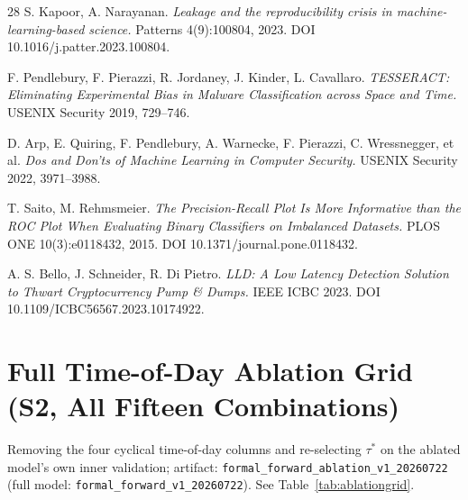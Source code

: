 \documentclass[runningheads]{llncs}
\begin{document}
\begin{thebibliography}{28}
S. Kapoor, A. Narayanan. \emph{Leakage and the reproducibility crisis
in machine-learning-based science.} Patterns 4(9):100804, 2023. DOI
10.1016/j.patter.2023.100804.

F. Pendlebury, F. Pierazzi, R. Jordaney, J. Kinder, L. Cavallaro.
\emph{TESSERACT: Eliminating Experimental Bias in Malware
Classification across Space and Time.} USENIX Security 2019, 729--746.

D. Arp, E. Quiring, F. Pendlebury, A. Warnecke, F. Pierazzi, C.
Wressnegger, et al. \emph{Dos and Don'ts of Machine Learning in
Computer Security.} USENIX Security 2022, 3971--3988.

T. Saito, M. Rehmsmeier. \emph{The Precision-Recall Plot Is More
Informative than the ROC Plot When Evaluating Binary Classifiers on
Imbalanced Datasets.} PLOS ONE 10(3):e0118432, 2015. DOI
10.1371/journal.pone.0118432.

A. S. Bello, J. Schneider, R. Di Pietro. \emph{LLD: A Low Latency
Detection Solution to Thwart Cryptocurrency Pump \& Dumps.} IEEE ICBC
2023. DOI 10.1109/ICBC56567.2023.10174922.

\end{thebibliography}

\appendix

\section{Full Time-of-Day Ablation Grid (S2, All Fifteen
Combinations)}\label{app:ablation}

Removing the four cyclical time-of-day columns and re-selecting
$\tau^{*}$ on the ablated model's own inner validation; artifact:
\texttt{formal\_forward\_ablation\_v1\_20260722} (full model:
\texttt{formal\_forward\_v1\_20260722}). See
Table~\ref{tab:ablationgrid}.
\end{document}
